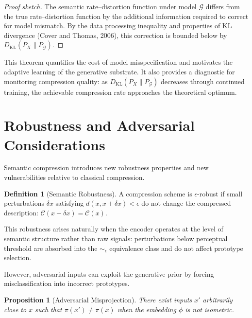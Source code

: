 \documentclass[11pt,a4paper]{article}
\newtheorem{proposition}[theorem]{Proposition}
\theoremstyle{definition}
\newtheorem{definition}[theorem]{Definition}
\theoremstyle{remark}
\begin{document}
\begin{proof}[Proof sketch]
The semantic rate--distortion function under model $\mathcal{G}$ differs from the true rate--distortion function by the additional information required to correct for model mismatch. By the data processing inequality and properties of KL divergence (Cover and Thomas, 2006), this correction is bounded below by $D_{\mathrm{KL}}(P_X \| P_{\mathcal{G}})$.
\end{proof}

This theorem quantifies the cost of model misspecification and motivates the adaptive learning of the generative substrate. It also provides a diagnostic for monitoring compression quality: as $D_{\mathrm{KL}}(P_X \| P_{\mathcal{G}})$ decreases through continued training, the achievable compression rate approaches the theoretical optimum.

\section{Robustness and Adversarial Considerations}
\label{sec:robustness}

Semantic compression introduces new robustness properties and new vulnerabilities relative to classical compression.

\begin{definition}[Semantic Robustness]
A compression scheme is $\epsilon$-robust if small perturbations $\delta x$ satisfying $d(x, x+\delta x) < \epsilon$ do not change the compressed description: $\mathcal{C}(x + \delta x) = \mathcal{C}(x)$.
\end{definition}

This robustness arises naturally when the encoder operates at the level of semantic structure rather than raw signals: perturbations below perceptual threshold are absorbed into the $\sim_\epsilon$ equivalence class and do not affect prototype selection.

However, adversarial inputs can exploit the generative prior by forcing misclassification into incorrect prototypes.

\begin{proposition}[Adversarial Misprojection]
There exist inputs $x'$ arbitrarily close to $x$ such that $\pi(x') \neq \pi(x)$ when the embedding $\phi$ is not isometric.
\end{proposition}
\end{document}
